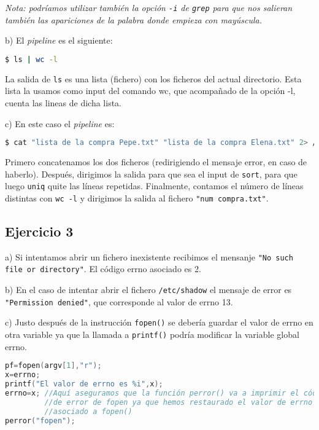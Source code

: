 \documentclass{article}
\begin{document}
\textit{Nota: podríamos utilizar también la opción \texttt{-i} de \texttt{grep} para que nos salieran también las apariciones de la palabra donde empieza con mayúscula.}

b) El \textit{pipeline} es el siguiente:

\begin{lstlisting}[language=bash]
$ ls | wc -l
\end{lstlisting}

La salida de \texttt{ls} es una lista (fichero) con los ficheros del actual directorio.
Esta lista la usamos como input del comando wc, que acompañado de la opción -l, cuenta las lineas de dicha lista.


c) En este caso el \textit{pipeline} es: 

\begin{lstlisting}[language=bash]
$ cat "lista de la compra Pepe.txt" "lista de la compra Elena.txt" 2> /dev/null | sort | uniq | wc -l > "num compra.txt"
\end{lstlisting}

Primero concatenamos los dos ficheros (redirigiendo el mensaje error, en caso de haberlo). Después, dirigimos la salida para que sea el input de \texttt{sort}, para que luego \texttt{uniq} quite las líneas repetidas. Finalmente, contamos el número de líneas distintas con \texttt{wc -l} y dirigimos la salida al fichero \texttt{"num compra.txt"}.

\subsection*{Ejercicio 3}

a) Si intentamos abrir un fichero inexistente recibimos el mensanje \texttt{"No such file or directory"}. El código errno asociado es 2.

b) En el caso de intentar abrir el fichero \texttt{/etc/shadow} el  mensaje de error es \texttt{"Permission denied"}, que corresponde al valor de errno 13.

c) Justo después de la instrucción \texttt{fopen()} se debería guardar el valor de errno en otra variable ya que la llamada a \texttt{printf()} podría modificar la variable global errno.

\begin{lstlisting}[language=C, texcl=true]
pf=fopen(argv[1],"r"); 
x=errno;
printf("El valor de errno es %i",x);
errno=x; //Aquí aseguramos que la función perror() va a imprimir el código 
         //de error de fopen ya que hemos restaurado el valor de errno 
         //asociado a fopen()
perror("fopen");
\end{lstlisting}
\end{document}

